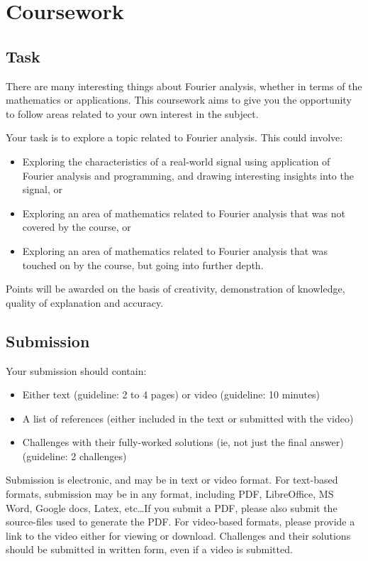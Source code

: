 \newpage
\section{Coursework}
\subsection{Task}
There are many interesting things about Fourier analysis, whether in terms of the mathematics or applications.
This coursework aims to give you the opportunity to follow areas related to your own interest in the subject.

Your task is to explore a topic related to Fourier analysis. This could involve:
\begin{itemize}
    \item Exploring the characteristics of a real-world signal using application of Fourier analysis and programming, and drawing interesting insights into the signal, or
    \item Exploring an area of mathematics related to Fourier analysis that was not covered by the course, or
    \item Exploring an area of mathematics related to Fourier analysis that was touched on by the course, but going into further depth.
\end{itemize}


Points will be awarded on the basis of creativity, demonstration of knowledge, quality of explanation and accuracy.

\subsection{Submission}
Your submission should contain:
\begin{itemize}
    \item Either text (guideline: 2 to 4 pages) or video (guideline: 10 minutes)
    \item A list of references (either included in the text or submitted with the video)
    \item Challenges with their fully-worked solutions (ie, not just the final answer) (guideline: 2 challenges)
\end{itemize}

Submission is electronic, and may be in text or video format. For text-based formats, submission may be in any format, including PDF, LibreOffice, MS Word, Google docs, Latex, etc\ldots If you submit a PDF, please also submit the source-files used to generate the PDF. For video-based formats, please provide a link to the video either for viewing or download. Challenges and their solutions should be submitted in written form, even if a video is submitted.

